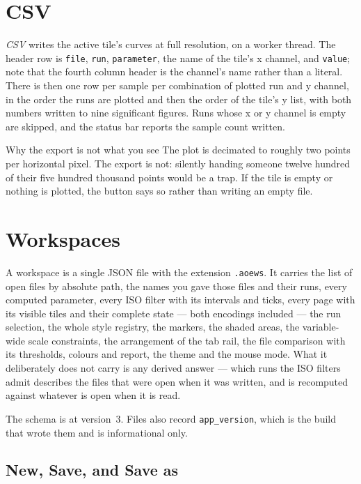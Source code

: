\documentclass[11pt,a4paper,oneside]{report}
\newcommand{\code}[1]{\texttt{#1}}
\begin{document}
\section{CSV}

\emph{CSV} writes the active tile's curves at full resolution, on a worker
thread. The header row is \code{file}, \code{run}, \code{parameter}, the name of
the tile's x channel, and \code{value}; note that the fourth column header is the
channel's name rather than a literal. There is then one row per sample per
combination of plotted run and y channel, in the order the runs are plotted and
then the order of the tile's y list, with both numbers written to nine
significant figures. Runs whose x or y channel is empty are skipped, and the
status bar reports the sample count written.

\begin{aoenote}{Why the export is not what you see}
The plot is decimated to roughly two points per horizontal pixel. The export is
not: silently handing someone twelve hundred of their five hundred thousand
points would be a trap. If the tile is empty or nothing is plotted, the button
says so rather than writing an empty file.
\end{aoenote}

\section{Workspaces}
\label{sec:workspaces}

A workspace is a single JSON file with the extension \code{.aoews}. It carries
the list of open files by absolute path, the names you gave those files and their
runs, every computed parameter, every ISO filter with its intervals
and ticks, every page with its visible tiles and their complete state --- both
encodings included --- the run selection, the whole style registry, the markers,
the shaded areas, the variable-wide scale constraints, the arrangement of the
tab rail, the file comparison with its thresholds, colours and report, the theme
and the mouse mode. What it deliberately does not carry is any derived answer
--- which runs the ISO filters admit describes the files that were open when it
was written, and is recomputed against whatever is open when it is read.

The schema is at version~3. Files also record \code{app\_version}, which is the
build that wrote them and is informational only.

\subsection{New, Save, and Save as}
\end{document}
